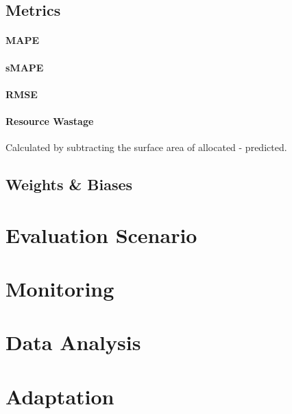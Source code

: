   \subsection{Metrics}

    \paragraph{MAPE}
    \paragraph{sMAPE}
    \paragraph{RMSE}
    \paragraph{Resource Wastage}
      Calculated by subtracting the surface area of allocated - predicted.

  \subsection{Weights \& Biases}
  
\section{Evaluation Scenario}
\section{Monitoring}
\section{Data Analysis}
\section{Adaptation}
